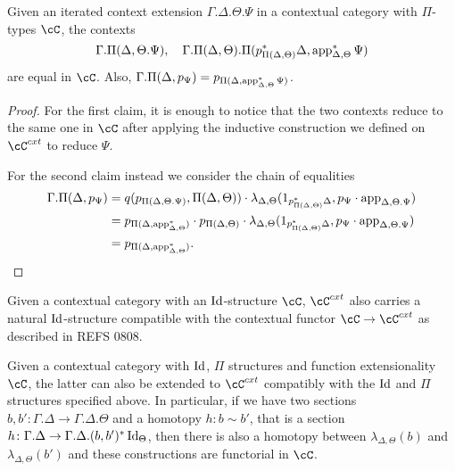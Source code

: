 \documentclass[a4paper,fontsize=12pt]{scrartcl}
\begin{document}
\begin{lem}
  Given an iterated context extension $\Gamma.\Delta.\Theta.\Psi$ in a
  contextual category with $\Pi$-types $\cC$, the contexts
  \[\Gamma.\Pi(\Delta,\Theta.\Psi),\quad\Gamma.\Pi(\Delta,\Theta).\Pi(p^*_{\Pi(\Delta,\Theta)}\Delta,\operatorname{app}^*_{\Delta,\Theta}\Psi)\]
  are equal in $\cC$. Also,
  $\Gamma.\Pi(\Delta,p_{\Psi})=p_{\Pi(\Delta,\operatorname{app}^*_{\Delta,\Theta}\Psi)}$.
\end{lem}
\begin{proof}
  For the first claim, it is enough to notice that the two contexts reduce to
  the same one in $\cC$ after applying the inductive construction we defined on
  $\cC^{cxt}$ to reduce $\Psi$.

  For the second claim instead we consider the chain of equalities
  \begin{align*}
    \Gamma.\Pi(\Delta,p_{\Psi})
    &=q(p_{\Pi(\Delta,\Theta.\Psi)},\Pi(\Delta,\Theta))\cdot
    \lambda_{\Delta,\Theta}(1_{p^*_{\Pi(\Delta,\Theta)}\Delta},p_\Psi\cdot\operatorname{app}_{\Delta,\Theta.\Psi}) \\
    &=p_{\Pi(\Delta,\operatorname{app}^*_{\Delta,\Theta})}\cdot
    p_{\Pi(\Delta,\Theta)}\cdot
    \lambda_{\Delta,\Theta}(1_{p^*_{\Pi(\Delta,\Theta)}\Delta},p_\Psi\cdot\operatorname{app}_{\Delta,\Theta.\Psi}) \\
    &=p_{\Pi(\Delta,\operatorname{app}^*_{\Delta,\Theta})}.
  \end{align*}
\end{proof}

\begin{prop}\cite[Prop.\ 3.3.1]{Gar09b}
  Given a contextual category with an $\operatorname{Id}$-structure $\cC$, $\cC^{cxt}$ also
  carries a natural $\operatorname{Id}$-structure compatible with the contextual functor
  $\cC\rightarrow\cC^{cxt}$ as described in REFS 0808.
\end{prop}

\begin{lem}\cite[Lemma 2.28]{1808}
  Given a contextual category with $\operatorname{Id}$, $\Pi$ structures and function
  extensionality $\cC$, the latter can also be extended to $\cC^{cxt}$
  compatibly with the $\operatorname{Id}$ and $\Pi$ structures specified above. In particular,
  if we have two sections
  $b,b'\colon\Gamma.\Delta\rightarrow\Gamma.\Delta.\Theta$ and a homotopy
  $h:b\sim b'$, that is a section
  $h\colon\Gamma.\Delta\rightarrow\Gamma.\Delta.(b,b')^*\operatorname{Id}_{\Theta}$,
  then there is also a homotopy between $\lambda_{\Delta,\Theta}(b)$ and
  $\lambda_{\Delta,\Theta}(b')$ and these constructions are functorial in $\cC$.
\end{lem}
\end{document}
